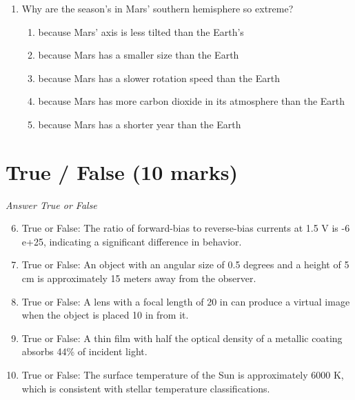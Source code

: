 \documentclass[12pt]{article}
\begin{document}
\begin{enumerate}[label=\arabic*.]
\begin{enumerate}[label=(\alph*)]
    \item (f / 3)
    \item (f / 2)
    \item (5 f / 3)
    \item (6 f / 5)
    \item (3 f / 4)
\end{enumerate}
\item Why are the season's in Mars' southern hemisphere so extreme?
\begin{enumerate}[label=(\alph*)]
    \item because Mars' axis is less tilted than the Earth's
    \item because Mars has a smaller size than the Earth
    \item because Mars has a slower rotation speed than the Earth
    \item because Mars has more carbon dioxide in its atmosphere than the Earth
    \item because Mars has a shorter year than the Earth
\end{enumerate}
\end{enumerate}

\section*{True / False (10 marks)}
\textit{Answer True or False}
\begin{enumerate}[label=\arabic*.]
\setcounter{enumi}{5}
\item True or False: The ratio of forward-bias to reverse-bias currents at 1.5 V is -6 e+25, indicating a significant difference in behavior.
\item True or False: An object with an angular size of 0.5 degrees and a height of 5 cm is approximately 15 meters away from the observer.
\item True or False: A lens with a focal length of 20 in can produce a virtual image when the object is placed 10 in from it.
\item True or False: A thin film with half the optical density of a metallic coating absorbs 44\% of incident light.
\item True or False: The surface temperature of the Sun is approximately 6000 K, which is consistent with stellar temperature classifications.
\end{enumerate}
\end{document}
